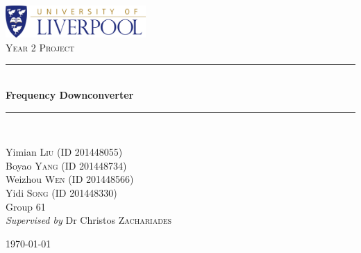 \documentclass[12pt, a4paper]{report}
\newcommand{\HRule}{\rule{\linewidth}{0.75mm}} %
\begin{document}
\begin{titlepage}   %
\begin{center}
\includegraphics[width=0.4\textwidth]{BigCrest}\\ \vspace{15 mm}   
\textsc{\Large Year 2 Project}\\ \vspace{15 mm}
\doublespace
\HRule \\ \vspace{8 mm}
{\huge \bfseries Frequency Downconverter}       %
\\\vspace{4 mm}
\HRule \\ \vspace{25 mm}

Yimian \textsc{Liu} (ID 201448055)      \\        %
Boyao \textsc{Yang} (ID 201448734)      \\        %
Weizhou \textsc{Wen} (ID 201448566)      \\        %
Yidi \textsc{Song} (ID 201448330)      \\        %
Group 61                                 \\        %

\vspace{15mm}
\emph{Supervised by } Dr Christos \textsc{Zachariades}     %

\vfill             %
{\large \today}    %
\end{center} 
\end{titlepage}


\begin{abstract}
Frequency Downconverter (FDC) is used in signal processing equipment to converter ratio frequency signal to low frequency signal. The low frequency signal is more convenient for signal processing \cite{ref:zhang}. In the project, a basic circuit of FDC was designed by student firstly. Then, a Printed Circuit Boards (PCB) of FDC was designed with software Eagle CAD and Altium Designer (AD). Then, the basic PCB was manufactured by Electrical and Electronic Engineer Department with the diagram. The test of products is also in the schedule initially. However, the whole products have not been finished in the end. In the project, students learnt how to understand the datasheet of components. Then, students learnt how to design circuit and PCB with software. The study of software for communication and documentation are also helpful, including Git and \LaTeX. The knowledge and experience in the project are meaningful in the future career of students.
\end{abstract}
\end{document}
